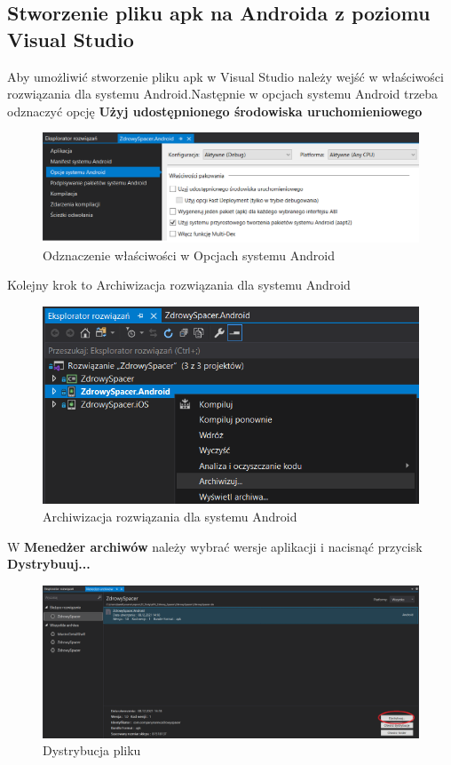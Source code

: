  \subsection{Stworzenie pliku apk na Androida z poziomu Visual Studio}
 \hspace{1cm}Aby umożliwić stworzenie pliku apk w Visual Studio należy wejść w właściwości rozwiązania dla systemu Android.Następnie w opcjach systemu Android trzeba odznaczyć opcję \textbf{Użyj udostępnionego środowiska uruchomieniowego}
 \begin{figure}[!htb]
 	\begin{center}
 		\includegraphics[width=12cm]{rys/apk_1.png}
 		\caption{Odznaczenie właściwości w Opcjach systemu Android}
 		\label{rys:rysunek007}
 	\end{center}
 \end{figure}
 \newline Kolejny krok to Archiwizacja rozwiązania dla systemu Android
 \begin{figure}[!htb]
 	\begin{center}
 		\includegraphics[width=12cm]{rys/apk_2.png}
 		\caption{Archiwizacja rozwiązania dla systemu Android}
 		\label{rys:rysunek008}
 	\end{center}
 \end{figure}
 \newline W \textbf{Menedżer archiwów} należy wybrać wersje aplikacji i nacisnąć przycisk \textbf{Dystrybuuj...}
 \begin{figure}[!htb]
 	\begin{center}
 		\includegraphics[width=12cm]{rys/apk_3.png}
 		\caption{Dystrybucja pliku}
 		\label{rys:rysunek009}
 	\end{center}
 \end{figure}
